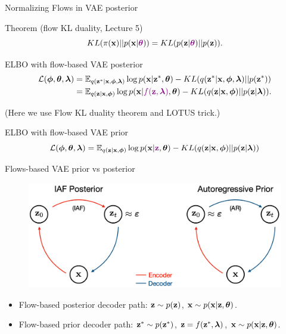 \begin{frame}{Normalizing Flows in VAE posterior}

	\begin{block}{Theorem (flow KL duality, Lecture 5)}
		\vspace{-0.3cm}
		\[
			KL(\pi(\mathbf{x}) || p(\mathbf{x} | {\color{violet}\boldsymbol{\theta}})) = KL(p(\mathbf{z} | {\color{violet}\boldsymbol{\theta}}) || p(\mathbf{z})).
		\]
		\vspace{-0.5cm}
	\end{block}
	\begin{block}{ELBO with flow-based VAE posterior}
		\vspace{-0.6cm}
		\begin{align*}
		\mathcal{L} (\boldsymbol{\phi}, \boldsymbol{\theta}, \boldsymbol{\lambda}) &=  \mathbb{E}_{q(\mathbf{z}^* | \mathbf{x}, \boldsymbol{\phi}, \boldsymbol{\lambda})} \log p(\mathbf{x} | \mathbf{z}^*, \boldsymbol{\theta}) - KL (q(\mathbf{z}^* | \mathbf{x}, \boldsymbol{\phi}, \boldsymbol{\lambda}) || p(\mathbf{z}^*)) \\ 
		&=  \mathbb{E}_{q(\mathbf{z} | \mathbf{x}, \boldsymbol{\phi})} \log p(\mathbf{x} | {\color{violet}f(\mathbf{z}, \boldsymbol{\lambda})}, \boldsymbol{\theta}) - KL (q(\mathbf{z} | \mathbf{x}, \boldsymbol{\phi}) || p(\mathbf{z} | \boldsymbol{\lambda})).
		\end{align*}
		\vspace{-0.6cm}
	\end{block}
	{\color{gray}(Here we use Flow KL duality theorem and LOTUS trick.)}
	
	\begin{block}{ELBO with flow-based VAE prior}
		\vspace{-0.5cm}
		\[
			\mathcal{L}(\boldsymbol{\phi}, \boldsymbol{\theta}, \boldsymbol{\lambda}) = \mathbb{E}_{q(\mathbf{z} | \mathbf{x}, \boldsymbol{\phi})} \log p(\mathbf{x} | {\color{violet}\mathbf{z}}, \boldsymbol{\theta}) - KL( q(\mathbf{z} | \mathbf{x}, \boldsymbol{\phi}) || p(\mathbf{z} | \boldsymbol{\lambda}))
		\]
		\vspace{-0.5cm}
	\end{block}
\end{frame}
\begin{frame}{Flows-based VAE prior vs posterior}
	\vspace{-1.5cm}
	\begin{figure}
		\includegraphics[width=0.65\linewidth]{figs/prior_vs_posterior}
	\end{figure}
	\begin{itemize}
		\item Flow-based posterior decoder path: $\mathbf{z} \sim p(\mathbf{z})$, $\mathbf{x} \sim p(\mathbf{x}|\mathbf{z}, \boldsymbol{\theta})$.
		\item Flow-based prior decoder path: $\mathbf{z}^* \sim p(\mathbf{z}^*)$, $\mathbf{z} = f(\mathbf{z}^*, \boldsymbol{\lambda})$, $\mathbf{x} \sim p(\mathbf{x}|\mathbf{z}, \boldsymbol{\theta})$. 
	\end{itemize}
\end{frame}
